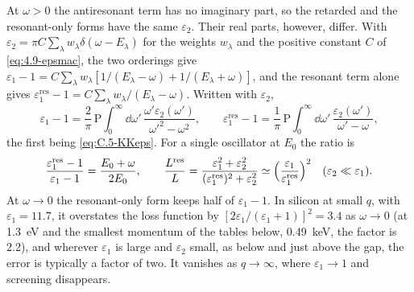 At $\omega > 0$ the antiresonant term has no imaginary part, so the retarded and the resonant-only forms have the same $\varepsilon_2$. Their real parts, however, differ. With $\varepsilon_2 = \pi C\sum_\lambda w_\lambda\delta(\omega - E_\lambda)$ for the weights $w_\lambda$ and the positive constant $C$ of \cref{eq:4.9-epsmac}, the two orderings give $\varepsilon_1 - 1 = C\sum_\lambda w_\lambda[1/(E_\lambda - \omega) + 1/(E_\lambda + \omega)]$, and the resonant term alone gives $\varepsilon_1^{\mathrm{res}} - 1 = C\sum_\lambda w_\lambda/(E_\lambda - \omega)$. Written with $\varepsilon_2$,
\begin{equation}
  \varepsilon_1 - 1 = \frac2\pi\,\mathrm{P}\!\int_0^\infty\dd\omega'\,\frac{\omega'\varepsilon_2(\omega')}{\omega'^2 - \omega^2} , \qquad
  \varepsilon_1^{\mathrm{res}} - 1 = \frac1\pi\,\mathrm{P}\!\int_0^\infty\dd\omega'\,\frac{\varepsilon_2(\omega')}{\omega' - \omega} ,
  \label{eq:10.5-kk}
\end{equation}
the first being \cref{eq:C.5-KKeps}. For a single oscillator at $E_0$ the ratio is
\begin{equation}
  \frac{\varepsilon_1^{\mathrm{res}} - 1}{\varepsilon_1 - 1} = \frac{E_0 + \omega}{2E_0} , \qquad
  \frac{L^{\mathrm{res}}}{L} = \frac{\varepsilon_1^2 + \varepsilon_2^2}{(\varepsilon_1^{\mathrm{res}})^2 + \varepsilon_2^2} \simeq \Bigl(\frac{\varepsilon_1}{\varepsilon_1^{\mathrm{res}}}\Bigr)^2 \quad (\varepsilon_2 \ll \varepsilon_1) .
  \label{eq:10.5-res}
\end{equation}
At $\omega \to 0$ the resonant-only form keeps half of $\varepsilon_1 - 1$. In silicon at small $q$, with $\varepsilon_1 = 11.7$, it overstates the loss function by $[2\varepsilon_1/(\varepsilon_1 + 1)]^2 = 3.4$ as $\omega \to 0$ (at \SI{1.3}{eV} and the smallest momentum of the tables below, \SI{0.49}{keV}, the factor is 2.2), and wherever $\varepsilon_1$ is large and $\varepsilon_2$ small, as below and just above the gap, the error is typically a factor of two. It vanishes as $q \to \infty$, where $\varepsilon_1 \to 1$ and screening disappears.

